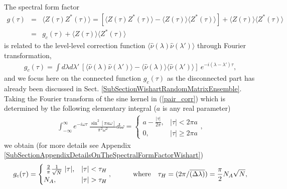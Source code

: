 \documentclass[aps,prb,preprint,onecolumn,amsmath,amssymb,superscriptaddress,eqsecnum,floatfix,scrartcl]{revtex4-1}
\begin{document}
The spectral form factor 
\begin{eqnarray}
\nonumber
g(\tau)&=&  \langle Z(\tau)Z^*(\tau)\rangle
=
\left [
\langle Z(\tau)Z^*(\tau)\rangle - \langle Z(\tau)\rangle \langle Z^*(\tau)\rangle\right]+
\langle Z(\tau)\rangle \langle Z^*(\tau)\rangle \\ 
\label{Connected-NonConnnectedSpectralFormfactor}
&=&g_c(\tau)+\langle Z(\tau)\rangle \langle Z^*(\tau)\rangle
\end{eqnarray}
 is related 
to  the level-level correction function
 $\langle {\hat \nu}(\lambda){ \hat \nu}(\lambda')\rangle$ through Fourier transformation, 
\begin{eqnarray}
g_c(\tau) 
=\int d\lambda d\lambda' \ 
\left [ \langle {\hat \nu}(\lambda) { \hat \nu}(\lambda')\rangle 
-
 \langle {\hat \nu}(\lambda)\rangle \langle { \hat \nu}(\lambda')\rangle
\right ]
\  e^{-i(\lambda-\lambda')\tau},
\end{eqnarray}
and we focus here on the connected function $g_c(\tau)$ as the disconnected part has already been discussed in
Sect. \ref{SubSectionWishartRandomMatrixEnsemble}. 
Taking the  Fourier transform of the sine
 kernel in (\ref{pair_corr}) which  is
determined by the following elementary integral ($a$ is any real parameter)
\begin{align}
\label{IntegralOfSine}
\int_{-\infty}^{\infty}e^{-i\omega \tau} \ \frac{\sin^2[\pi a \omega]}{\pi^2\omega^2}d\omega=
\begin{cases} a-\frac{|\tau|}{2\pi}, & |\tau|<2\pi a \\ 0, & |\tau|\geq 2\pi a \end{cases},
\end{align}
we  obtain (for more details see
Appendix
\ref{SubSectionAppendixDetailsOnTheSpectralFormFactorWishart})
\begin{eqnarray}
\label{``ramp''}
g_c(\tau)=
\begin{cases}  \   {2 \over \pi} {1\over \sqrt{N}} \ |\tau|, & |\tau| <   \tau_H \\ 
N_A, &   |\tau| >   \tau_H
 \end{cases},
\qquad \quad {\rm where} \  \ \ \tau_H=
(2\pi/ \overline{\left (\Delta \lambda\right )} )=
{\pi\over 2} N_A \sqrt{N},
\end{eqnarray}
\end{document}
